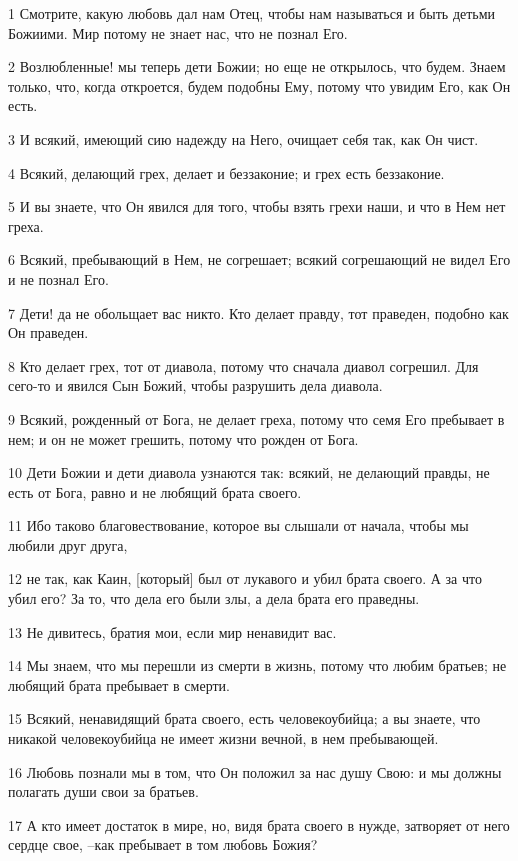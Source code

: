 \par 1 Смотрите, какую любовь дал нам Отец, чтобы нам называться и быть детьми Божиими. Мир потому не знает нас, что не познал Его.
\par 2 Возлюбленные! мы теперь дети Божии; но еще не открылось, что будем. Знаем только, что, когда откроется, будем подобны Ему, потому что увидим Его, как Он есть.
\par 3 И всякий, имеющий сию надежду на Него, очищает себя так, как Он чист.
\par 4 Всякий, делающий грех, делает и беззаконие; и грех есть беззаконие.
\par 5 И вы знаете, что Он явился для того, чтобы взять грехи наши, и что в Нем нет греха.
\par 6 Всякий, пребывающий в Нем, не согрешает; всякий согрешающий не видел Его и не познал Его.
\par 7 Дети! да не обольщает вас никто. Кто делает правду, тот праведен, подобно как Он праведен.
\par 8 Кто делает грех, тот от диавола, потому что сначала диавол согрешил. Для сего-то и явился Сын Божий, чтобы разрушить дела диавола.
\par 9 Всякий, рожденный от Бога, не делает греха, потому что семя Его пребывает в нем; и он не может грешить, потому что рожден от Бога.
\par 10 Дети Божии и дети диавола узнаются так: всякий, не делающий правды, не есть от Бога, равно и не любящий брата своего.
\par 11 Ибо таково благовествование, которое вы слышали от начала, чтобы мы любили друг друга,
\par 12 не так, как Каин, [который] был от лукавого и убил брата своего. А за что убил его? За то, что дела его были злы, а дела брата его праведны.
\par 13 Не дивитесь, братия мои, если мир ненавидит вас.
\par 14 Мы знаем, что мы перешли из смерти в жизнь, потому что любим братьев; не любящий брата пребывает в смерти.
\par 15 Всякий, ненавидящий брата своего, есть человекоубийца; а вы знаете, что никакой человекоубийца не имеет жизни вечной, в нем пребывающей.
\par 16 Любовь познали мы в том, что Он положил за нас душу Свою: и мы должны полагать души свои за братьев.
\par 17 А кто имеет достаток в мире, но, видя брата своего в нужде, затворяет от него сердце свое, --как пребывает в том любовь Божия?
